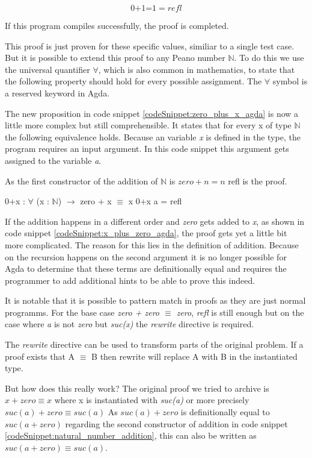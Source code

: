 $$\text{0+1=1} = refl$$

If this program compiles successfully, the proof is completed.

This proof is just proven for these specific values, similiar to a single test case. But it is possible to extend this proof to any Peano number $\mathbb{N}$. 
To do this we use the universal quantifier $\forall$, which is also common in mathematics, to state that the following property should hold for every possible assignment\cite{plfa2019}.
The $\forall$ symbol is a reserved keyword in Agda.

The new proposition in code snippet \ref{codeSnippet:zero_plus_x_agda} is now a little more complex but still comprehensible. It states that for every x of type $\mathbb{N}$ the following equivalence holds. 
Because an variable \emph{x} is defined in the type, the program requires an input argument. In this code snippet this argument gets assigned to the variable \emph{a}.

As the first constructor of the addition of $\mathbb{N}$ is $zero + n = n$ refl is the proof.

\begin{codesnippet}[mathescape=true, caption={Proof of addition to zero in Agda}, label={codeSnippet:zero_plus_x_agda}]
0+x : $\forall$ (x : $\mathbb{N}$) $\rightarrow$ zero + x $\equiv$ x
0+x a = refl
\end{codesnippet}

If the addition happens in a different order and \emph{zero} gets added to \emph{x}, as shown in code snippet \ref{codeSnippet:x_plus_zero_agda}, the proof gets yet a little bit more complicated. 
The reason for this lies in the definition of addition.
Because on the recursion happens on the second argument it is no longer possible for Agda to determine that these terms are definitionally equal and requires the programmer to add additional hints to be able to prove this indeed.

It is notable that it is possible to pattern match in proofs as they are just normal programms. 
For the base case \emph{zero + zero $\equiv$ zero}, \emph{refl} is still enough but on the case where \emph{a} is not \emph{zero} but \emph{suc(x)} the \emph{rewrite} directive is required.

The \emph{rewrite} directive can be used to transform parts of the original problem. If a proof exists that A $\equiv$ B then rewrite will replace A with B in the instantiated type.

But how does this really work?
The original proof we tried to archive is $x + zero \equiv x$ where x is instantiated with \emph{suc(a)} or more precisely $suc(a) + zero \equiv suc(a)$
As $suc(a) + zero$ is definitionally equal to $suc(a + zero)$ regarding the second constructor of addition in code snippet \ref{codeSnippet:natural_number_addition}, this can also be written as $suc(a + zero) \equiv suc(a)$.

